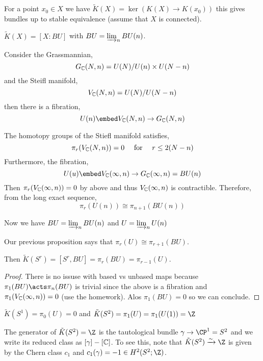 \documentclass[12pt]{extarticle}
\begin{document}
\begin{defn}
For a point $x_0 \in X$ we have $\tilde{K}(X) = \ker{(K(X) \to K(x_0))}$ this gives bundles up to stable equivalence (assume that $X$ is connected). 
\end{defn}

\begin{prop}
$\tilde{K}(X) = [X : BU]$ with $BU = \varinjlim_n BU(n)$.
\end{prop}

\begin{rmk}
Consider the Grassmannian,
\[ G_{\mathbb{C}}(N, n) = U(N) / U(n) \times U(N-n) \]
and the Steifl manifold,
\[ V_{\mathbb{C}}(N, n) = U(N) / U(N-n) \]
then there is a fibration,
\[ U(n) \embed V_\C(N, n) \to G_\C(N, n) \]
\end{rmk}

\begin{prop}
The homotopy groups of the Stiefl manifold satisfies,
\[ \pi_r(V_{\mathbb{C}}(N, n)) = 0 \quad \text{ for } \quad r \le 2 (N - n) \]
Furthermore, the fibration,
\[ U(u) \embed V_\C(\infty, n) \to G_\C(\infty, n) = BU(n) \]
Then $\pi_r(V_{\mathbb{C}}(\infty, n)) = 0$ by above and thus $V_{\mathbb{C}}(\infty, n)$ is contractible. Therefore, from the long exact sequence,
\[ \pi_r(U(n)) \cong \pi_{n+1}(BU(n)) \]
\end{prop}

\begin{defn}
Now we have $BU = \varinjlim_n BU(n)$ and $U = \varinjlim_n U(n)$
\end{defn}

\begin{rmk}
Our previous proposition says that $\pi_r(U) \cong \pi_{r+1}(BU)$. 
\end{rmk}

\begin{prop}
Then $\tilde{K}(S^r) = [S^r, BU] = \pi_r(BU) = \pi_{r-1}(U)$. 
\end{prop}

\begin{proof}
There is no issuse with based vs unbased maps because $\pi_1(BU) \acts \pi_n(BU)$ is trivial since the above is a fibration and $\pi_1(V_{\mathbb{C}}(\infty, n)) = 0$ (use the homework). Alos $\pi_1(BU) = 0$ so we can conclude.
\end{proof}

\begin{example}
$\tilde{K}(S^1) = \pi_0(U) = 0$ and $\tilde{K}(S^2) = \pi_1(U) = \pi_1(U(1)) = \Z$ 
\end{example}

\begin{rmk}
The generator of $\tilde{K}(S^2) = \Z$ is the tautological bundle $\gamma \to \CP^1 = S^2$ and we write its reduced class as $[\gamma] - [\mathbb{C}]$. To see this, note that $\tilde{K}(S^2) \xrightarrow{\sim} \Z$ is given by the Chern class $c_1$ and $c_1(\gamma) = -1 \in H^2(S^2; \Z)$.
\end{rmk}
\end{document}
